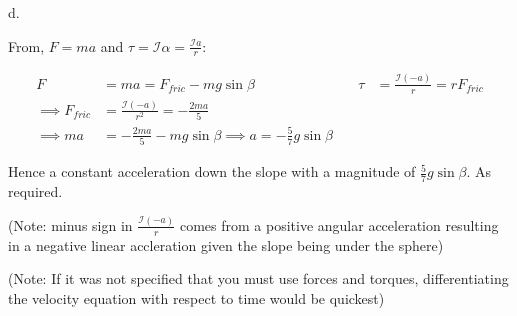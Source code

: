 \documentclass[12pt]{article}
\begin{document}
   d.
    \begin{center}
    \end{center}

    From, $F=ma$ and $\tau=\mathcal{I}\alpha=\frac{\mathcal{I}a}{r}$:

    \begin{equation*}
        \begin{alignedat}{2}
            F&=ma=F_{fric}-mg\sin{\beta}\quad&\quad\tau&=\frac{\mathcal{I}(-a)}{r}=rF_{fric}\\
            \implies F_{fric}&=\frac{\mathcal{I}(-a)}{r^2}=-\frac{2ma}{5}\\
            \implies ma&=-\frac{2ma}{5}-mg\sin{\beta}
            \implies a=-\frac{5}{7}g\sin\beta
        \end{alignedat}
    \end{equation*}

    Hence a constant acceleration down the slope with a magnitude of $\frac{5}{7}g\sin\beta$. As required.

    (Note: minus sign in $\frac{\mathcal{I}(-a)}{r}$ comes from a positive angular acceleration resulting in a negative linear accleration given the slope being under the sphere)

    (Note: If it was not specified that you must use forces and torques, differentiating the velocity equation with respect to time would be quickest)
\end{document}
